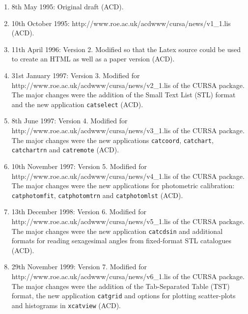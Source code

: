 \documentclass[twoside,11pt]{starlink}
\begin{document}
\begin{enumerate}

  \item 8th May 1995: Original draft (ACD).

  \item 10th October 1995: 
   {http://www.roe.ac.uk/acdwww/cursa/news/v1_1.lis} (ACD).

  \item 11th April 1996: Version 2.  Modified so that the Latex source
   could be used to create an HTML as well as a paper version (ACD).

  \item 31st January 1997: Version 3.
   Modified for 
   {http://www.roe.ac.uk/acdwww/cursa/news/v2_1.lis} of the CURSA package.
   The major changes were the addition of the Small Text List (STL) format
   and the new application \texttt{catselect} (ACD).

  \item 8th June 1997: Version 4.
   Modified for 
   {http://www.roe.ac.uk/acdwww/cursa/news/v3_1.lis} of the CURSA package.
   The major changes were the new applications \texttt{catcoord}, \texttt{catchart}, \texttt{catchartrn} and \texttt{catremote} (ACD).

  \item 10th November 1997: Version 5.
   Modified for 
   {http://www.roe.ac.uk/acdwww/cursa/news/v4_1.lis} of the CURSA package.
   The major changes were the new applications for photometric calibration:
   \texttt{catphotomfit}, \texttt{catphotomtrn} and \texttt{catphotomlst} (ACD).

  \item 13th December 1998: Version 6.
   Modified for 
   {http://www.roe.ac.uk/acdwww/cursa/news/v5_1.lis} of the CURSA package.
   The major changes were the new application \texttt{catcdsin} and additional
   formats for reading sexagesimal angles from fixed-format STL catalogues
   (ACD).

  \item 29th November 1999: Version 7.
   Modified for 
   {http://www.roe.ac.uk/acdwww/cursa/news/v6_1.lis} of the CURSA package.
   The major changes were the addition of the Tab-Separated Table (TST)
   format, the new application \texttt{catgrid} and options for plotting
   scatter-plots and histograms in \texttt{xcatview} (ACD).


\end{enumerate}
\end{document}
